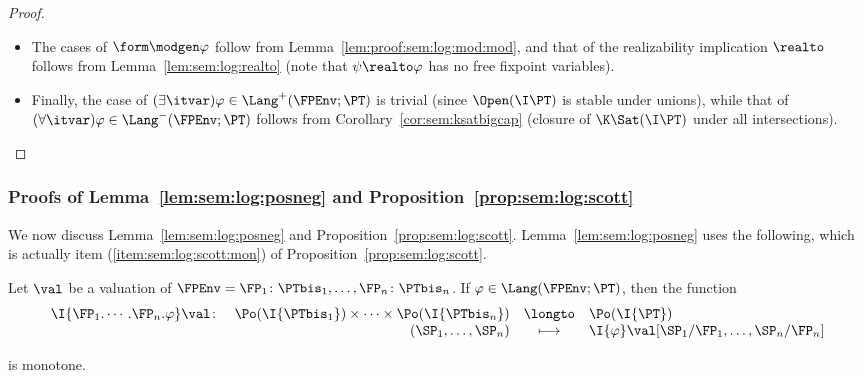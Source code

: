 \begin{proof}
\begin{itemize}
\item
The cases of $\form\modgen\varphi$ follow from Lemma~\ref{lem:proof:sem:log:mod:mod},
and that of the realizability implication $\realto$ 
follows from Lemma~\ref{lem:sem:log:realto}
(note that $\psi \realto \varphi$ has no free fixpoint variables).

\item
Finally, the case of $(\exists \itvar)\varphi \in \Lang^+(\FPEnv;\PT)$
is trivial (since $\Open(\I\PT)$ is stable under unions),
while that of $(\forall \itvar)\varphi \in \Lang^-(\FPEnv;\PT)$
follows from Corollary~\ref{cor:sem:ksatbigcap}
(closure of $\K\Sat(\I\PT)$ under all intersections).
\qedhere
\end{itemize}
\end{proof}




\subsubsection{Proofs of Lemma~\ref{lem:sem:log:posneg}
and Proposition~\ref{prop:sem:log:scott}}



We now discuss Lemma~\ref{lem:sem:log:posneg}
and Proposition~\ref{prop:sem:log:scott}.
Lemma~\ref{lem:sem:log:posneg} uses the following,
which is actually item (\ref{item:sem:log:scott:mon})
of Proposition~\ref{prop:sem:log:scott}.

\begin{lemma}
\label{lem:proof:sem:log:form:mon}
Let $\val$ be a valuation of
$\FPEnv = \FP_1\colon \PTbis_1, \dots, \FP_n\colon \PTbis_n$.
%
If $\varphi \in \Lang(\FPEnv;\PT)$,
then the function
\[
\begin{array}{l r c l}
  \I{\FP_1.\cdots.\FP_n.\varphi}\val \colon
& \Po(\I{\PTbis_1}) \times \dots \times \Po(\I{\PTbis_n})
& \longto
& \Po(\I{\PT})
\\
%
& (\SP_1,\dots,\SP_n)
& \longmapsto
& \I{\varphi}\val[\SP_1 / \FP_1, \dots, \SP_n / \FP_n]
\end{array}
\]

\noindent
is monotone.
\end{lemma}

